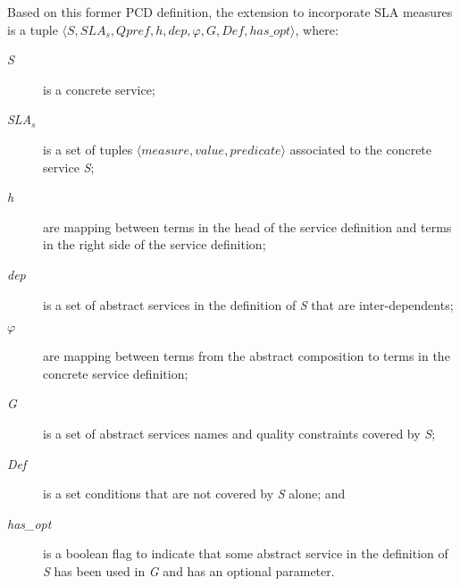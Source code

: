 \documentclass[12pt,a4paper,oneside]{report}
\begin{document}
Based on this former PCD definition, the extension to incorporate SLA measures is a tuple $\langle S, SLA_s, Qpref, h, dep, \varphi, G, Def, has\_opt\rangle$, where: 
\begin{description}
\item[\textit{S}] is a concrete service;
\item[\textit{SLA$_s$}] is a set of tuples $\langle measure, value, predicate\rangle$ associated to the concrete service \textit{S};
\item[\textit{h}] are mapping between terms in the head of the service definition and terms in the right side of the  service definition;
\item[\textit{dep}] is a set of abstract services in the definition of \textit{S} that are inter-dependents;
\item[\textit{$\varphi$}] are mapping between terms from the abstract composition to terms in the concrete service definition;
\item[\textit{G}] is a set of abstract services names and quality constraints covered by \textit{S};
\item[\textit{Def}] is a set conditions that are not covered by \textit{S} alone; and
\item[\textit{has\_opt}] is a boolean flag to indicate that some abstract service in the definition of \textit{S} has been used in \textit{G} and has an optional parameter.
\end{description}
\end{document}
